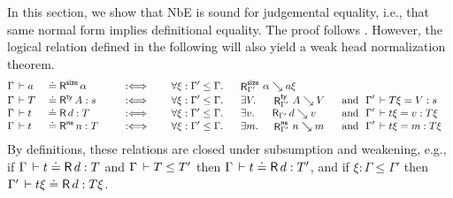 \documentclass[acmlarge,review,anonymous]{acmart}\settopmatter{printfolios=true}
\begin{document}
In this section, we show that NbE is sound for judgemental equality, i.e., that same normal form implies definitional equality.  The proof follows \citet{abelCoquandDybjer:lics07,abel:habil}.  However, the logical relation defined in the following will also yield a weak head normalization theorem.
\begin{alignat*}{8}
& \Gamma \der a && \doteq \tRsize\, \alpha
  && \quad\defas\quad
  && \forall \xi : \Gamma' \leq \Gamma.\ \
  && \mathrlap{ \RSize {\Gamma'} \alpha {a\xi} }
\\[-0.6ex]
& \Gamma \der T && \doteq \tRty\, A  : s
  && \quad\defas\quad
  && \forall \xi : \Gamma' \leq \Gamma.\ \
  && \exists V.\
  && \RTy{\Gamma'} A V
  && ~\mand~ \Gamma' \der T\xi = V : s
\\[-0.6ex]
& \Gamma \der t && \doteq \tR\, d  : T
  && \quad\defas\quad
  && \forall \xi : \Gamma' \leq \Gamma.\ \
  && \exists v.\
  && \R{\Gamma'} d v
  && ~\mand~ \Gamma' \der t\xi = v : T\xi
\\[-0.6ex]
& \Gamma \der t && \doteq \tRne\, n  : T
  && \quad\defas\quad
  && \forall \xi : \Gamma' \leq \Gamma.\ \
  && \exists m.\
  && \RNe{\Gamma'} n m
  && ~\mand~ \Gamma' \der t\xi = m : T\xi
\end{alignat*}
By definitions, these relations are closed under subsumption and
weakening, e.g., if $\Gamma \,\vdash t \doteq \mathsf{R}\, d : T$ and $\Gamma \,\vdash T \leq T'$ then $\Gamma \,\vdash t \doteq \mathsf{R}\, d : T'$,
and if $\xi : \Gamma \leq \Gamma'$ then $\Gamma' \,\vdash t\xi \doteq \mathsf{R}\, d : T\xi$.
\end{document}
